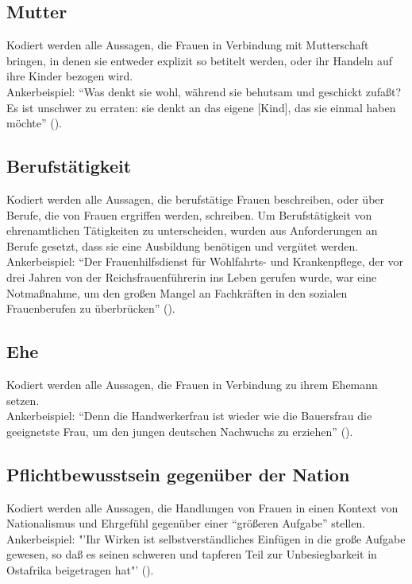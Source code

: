 \documentclass[12pt, titlepage=true, toc=bib]{scrartcl}
\begin{document}
{\subsection*{Mutter}

Kodiert werden alle Aussagen, die Frauen in Verbindung mit Mutterschaft bringen, in denen sie entweder explizit so betitelt werden, oder ihr Handeln auf ihre Kinder bezogen wird.\\
Ankerbeispiel: "`Was denkt sie wohl, während sie behutsam und geschickt zufaßt? Es ist unschwer zu erraten: sie denkt an das eigene [Kind], das sie einmal haben möchte"' (\cite[775]{a._v._s._kameradschaft_1936}).

\subsection*{Berufstätigkeit}

Kodiert werden alle Aussagen, die berufstätige Frauen beschreiben, oder über Berufe, die von Frauen ergriffen werden, schreiben. Um Berufstätigkeit von ehrenamtlichen Tätigkeiten zu unterscheiden, wurden aus Anforderungen an Berufe gesetzt, dass sie eine Ausbildung benötigen und vergütet werden.\\
Ankerbeispiel: "`Der Frauenhilfsdienst für Wohlfahrts- und Krankenpflege, der vor drei Jahren von der Reichsfrauenführerin ins Leben gerufen wurde, war eine Notmaßnahme, um den großen Mangel an Fachkräften in den sozialen Frauenberufen zu überbrücken"' (\cite[22]{reimer_glucklich_1941}).

\subsection*{Ehe}

Kodiert werden alle Aussagen, die Frauen in Verbindung zu ihrem Ehemann setzen.\\
Ankerbeispiel: "`Denn die Handwerkerfrau ist wieder wie die Bauersfrau die geeignetste Frau, um den jungen deutschen Nachwuchs zu erziehen"' (\cite[836]{scholtz-klink_frauen_1936}).

\subsection*{Pflichtbewusstsein gegenüber der Nation}

Kodiert werden alle Aussagen, die Handlungen von Frauen in einen Kontext von Nationalismus und Ehrgefühl gegenüber einer "`größeren Aufgabe"' stellen.\\
Ankerbeispiel: "'Ihr Wirken ist selbstverständliches Einfügen in die große Aufgabe gewesen, so daß es seinen schweren und tapferen Teil zur Unbesiegbarkeit in Ostafrika beigetragen hat"' (\cite[669]{maltzahn_deutsche_1936}).

}
\end{document}
